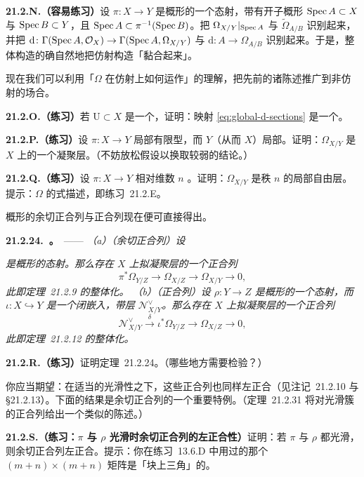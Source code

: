 \textbf{21.2.N.（容易练习）}\quad 设 $\pi\colon X\to Y$ 是概形的一个态射，带有开子概形 $\operatorname{Spec} A\subset X$ 与 $\operatorname{Spec} B\subset Y$，且 $\operatorname{Spec} A\subset\pi^{-1}(\operatorname{Spec} B)$。把 $\Omega_{X/Y}|_{\operatorname{Spec} A}$ 与 $\widetilde{\Omega}_{A/B}$ 识别起来，并把 $\mathrm{d}\colon\Gamma(\operatorname{Spec} A,\mathcal{O}_X)\to\Gamma(\operatorname{Spec} A,\Omega_{X/Y})$ 与 $\mathrm{d}\colon A\to\Omega_{A/B}$ 识别起来。于是，整体构造的确自然地把仿射构造「黏合起来」。

现在我们可以利用「$\Omega$ 在仿射\trOpenSet{}上如何运作」的理解，把先前的诸陈述推广到非仿射的场合。

\textbf{21.2.O.（练习）}\quad 若 $\mathrm{U}\subset X$ 是一个\trOpenSubset，证明：映射 \eqref{eq:global-d-sections} 是一个\trDerivation。

\textbf{21.2.P.（练习）}\quad 设 $\pi\colon X\to Y$ 局部有限型，而 $Y$（从而 $X$）局部\trNoetherian。证明：$\Omega_{X/Y}$ 是 $X$ 上的一个凝聚层。（不妨放松\trNoetherian{}假设以换取较弱的结论。）

\textbf{21.2.Q.（练习）}\quad 设 $\pi\colon X\to Y$ 相对维数 $n$ \trSmooth。证明：$\Omega_{X/Y}$ 是秩 $n$ 的局部自由层。提示：$\Omega$ 的\trJacobianMatrix{}式描述，即\mbox{练习~21.2.E}。

概形的余切正合列与\trConormal{}正合列现在便可直接得出。

\textbf{21.2.24.\ \trhTheorem。}\ ——
\emph{（a）（余切正合列）设}
\emph{是概形的态射。那么存在 $X$ 上拟凝聚层的一个正合列}
\[
\pi^*\Omega_{Y/Z}\longrightarrow\Omega_{X/Z}\longrightarrow\Omega_{X/Y}\longrightarrow 0,
\]
\emph{此即\mbox{定理~21.2.9} 的整体化。
（b）（\trConormal{}正合列）设 $\rho\colon Y\to Z$ 是概形的一个态射，而 $\iota\colon X\hookrightarrow Y$ 是一个闭嵌入，带\trConormal{}层 $\mathscr{N}^{\vee}_{X/Y}$。那么存在 $X$ 上拟凝聚层的一个正合列}
\[
\mathscr{N}^{\vee}_{X/Y}\xrightarrow{\ \delta\ }\iota^*\Omega_{Y/Z}\longrightarrow\Omega_{X/Z}\longrightarrow 0,
\]
\emph{此即\mbox{定理~21.2.12} 的整体化。}

\textbf{21.2.R.（练习）}\quad 证明\mbox{定理~21.2.24}。（哪些地方需要检验？）

你应当期望：在适当的光滑性之下，这些正合列也同样左正合（见\mbox{注记~21.2.10} 与 \S21.2.13）。下面的结果是余切正合列的一个重要特例。（\mbox{定理~21.2.31} 将对光滑簇的\trConormal{}正合列给出一个类似的陈述。）

\textbf{21.2.S.（练习：$\pi$ 与 $\rho$ 光滑时余切正合列的左正合性）}\quad 证明：若 $\pi$ 与 $\rho$ 都光滑，则余切正合列左正合。提示：你在\mbox{练习~13.6.D} 中用过的那个 $(m+n)\times(m+n)$ 矩阵是「块上三角」的。

